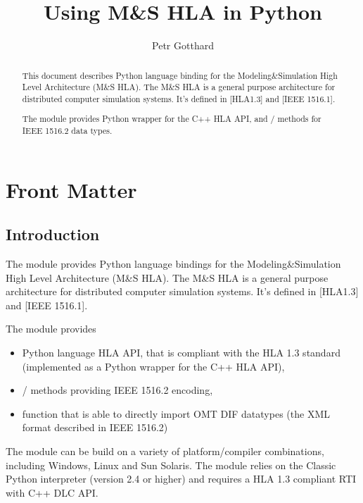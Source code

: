 \documentclass[12pt,a4paper]{howto}
\title{Using M\&S HLA in Python}
\author{Petr Gotthard}
\begin{document}
\maketitle

%
\ifhtml
\chapter*{Front Matter\label{front}}
\fi


\begin{abstract}
\noindent
This document describes Python language binding for the Modeling\&Simulation
High Level Architecture (M\&S HLA).
The M\&S HLA is a general purpose architecture for distributed computer
simulation systems. It's defined in [HLA1.3] and [IEEE 1516.1].

The  module provides Python wrapper for the C++ HLA API, and
/ methods for IEEE 1516.2 data types.
\end{abstract}

\tableofcontents

\section{Introduction}

The  module provides Python language bindings for the
Modeling\&Simulation High Level Architecture (M\&S HLA).
The M\&S HLA is a general purpose architecture for distributed computer
simulation systems. It's defined in [HLA1.3] and [IEEE 1516.1].

The  module provides
\begin{itemize}
\item Python language HLA API, that is compliant with the HLA 1.3 standard
(implemented as a Python wrapper for the C++ HLA API),
\item {}/ methods providing IEEE 1516.2 encoding,
\item {} function that is able to directly import OMT DIF
datatypes (the XML format described in IEEE 1516.2)
\end{itemize}

The  module can be build on a variety of platform/compiler
combinations, including Windows, Linux and Sun Solaris.
The module relies on the Classic Python interpreter (version 2.4 or higher)
and requires a HLA 1.3 compliant RTI with C++ DLC API.
\end{document}
